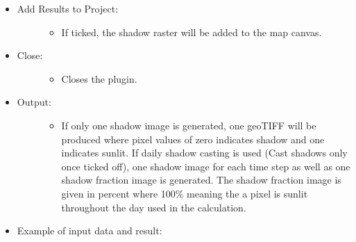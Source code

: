 \documentclass[letterpaper,10pt,english]{sphinxmanual}
\begin{document}
\begin{itemize}
\begin{description}
\begin{itemize}
\end{itemize}

\end{description}

\item {} \begin{description}
\item[{Add Results to Project:}] \leavevmode\begin{itemize}
\item {} 
If ticked, the shadow raster will be added to the map canvas.

\end{itemize}

\end{description}

\item {} \begin{description}
\item[{Close:}] \leavevmode\begin{itemize}
\item {} 
Closes the plugin.

\end{itemize}

\end{description}

\item {} \begin{description}
\item[{Output:}] \leavevmode\begin{itemize}
\item {} 
If only one shadow image is generated, one geoTIFF will be produced where pixel values of zero indicates shadow and one indicates sunlit. If daily shadow casting is used (Cast shadows only once ticked off), one shadow image for each time step as well as one shadow fraction image is generated. The shadow fraction image is given in percent where 100\% meaning the a pixel is sunlit throughout the day used in the calculation.

\end{itemize}

\end{description}

\item {} 
Example of input data and result:

\end{itemize}
\end{document}
